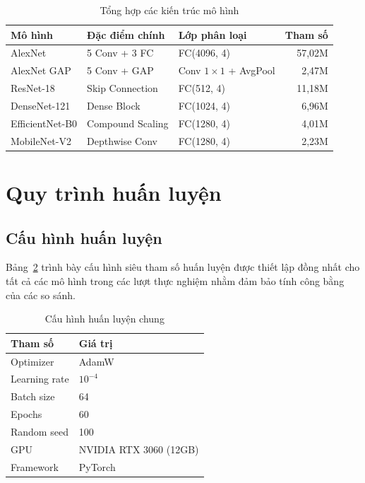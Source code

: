\begin{table}[H]
\centering
\caption{Tổng hợp các kiến trúc mô hình}
\label{tab:model_summary}
\begin{tabular}{lllr}
\toprule
\textbf{Mô hình} & \textbf{Đặc điểm chính} & \textbf{Lớp phân loại} & \textbf{Tham số} \\
\midrule
AlexNet & 5 Conv + 3 FC & FC(4096, 4) & 57,02M \\
AlexNet GAP & 5 Conv + GAP & Conv $1\times1$ + AvgPool & 2,47M \\
ResNet-18 & Skip Connection & FC(512, 4) & 11,18M \\
DenseNet-121 & Dense Block & FC(1024, 4) & 6,96M \\
EfficientNet-B0 & Compound Scaling & FC(1280, 4) & 4,01M \\
MobileNet-V2 & Depthwise Conv & FC(1280, 4) & 2,23M \\
\bottomrule
\end{tabular}
\end{table}


\section{Quy trình huấn luyện}
\label{sec:training_procedure}

\subsection{Cấu hình huấn luyện}

Bảng~\ref{tab:training_config} trình bày cấu hình siêu tham số huấn luyện được thiết lập đồng nhất cho tất cả các mô hình trong các lượt thực nghiệm nhằm đảm bảo tính công bằng của các so sánh.

\begin{table}[H]
\centering
\caption{Cấu hình huấn luyện chung}
\label{tab:training_config}
\begin{tabular}{ll}
\toprule
\textbf{Tham số} & \textbf{Giá trị} \\
\midrule
Optimizer & AdamW \\
Learning rate & $10^{-4}$ \\
Batch size & 64 \\
Epochs & 60 \\
Random seed & 100 \\
GPU & NVIDIA RTX 3060 (12GB) \\
Framework & PyTorch \\
\bottomrule
\end{tabular}
\end{table}

